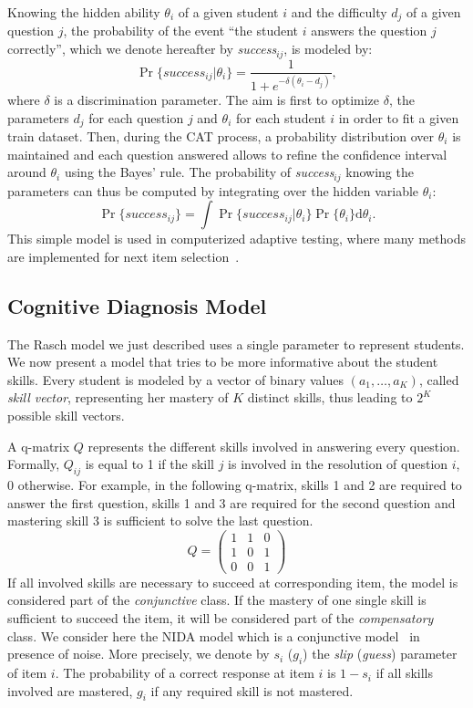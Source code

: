 \documentclass{edm_template}
\begin{document}
Knowing the hidden ability $\theta_i$ of a given student $i$ and the difficulty $d_j$ of a given question $j$, the probability of the event ``the student $i$ answers the question $j$ correctly'', which we denote hereafter by \emph{success}$_{ij}$, is modeled by:
\[ \Pr\{success_{ij}|\theta_i\} = \frac1{1+e^{-\delta(\theta_i - d_j)}}, \]
where $\delta$ is a discrimination parameter. The aim is first to optimize $\delta$, the parameters $d_j$ for each question $j$ and $\theta_i$ for each student $i$ in order to fit a given train dataset. Then, during the CAT process, a probability distribution over $\theta_i$ is maintained and each question answered allows to refine the confidence interval around $\theta_i$ using the Bayes' rule. The probability of \emph{success}$_{ij}$ knowing the parameters can thus be computed by integrating over the hidden variable $\theta_i$:
\[ \Pr\{success_{ij}\} = \int \Pr\{success_{ij}|\theta_i\} \Pr\{\theta_i\} \mathrm d\theta_i. \]
This simple model is used in computerized adaptive testing, where many methods are implemented for next item selection~\cite{MagisRaiche2012}.

\subsection{Cognitive Diagnosis Model}

The Rasch model we just described uses a single parameter to represent students. We now present a model that tries to be more informative about the student skills. Every student is modeled by a vector of binary values $(a_1, \ldots, a_K)$, called \emph{skill vector}, representing her mastery of $K$ distinct skills, thus leading to $2^K$ possible skill vectors. 

A q-matrix $Q$ \cite{Tatsuoka1983} represents the different skills involved in answering every question. Formally, $Q_{ij}$ is equal to 1 if the skill $j$ is involved in the resolution of question $i$, 0 otherwise. For example, in the following q-matrix, skills 1 and 2 are required to answer the first question, skills 1 and 3 are required for the second question and mastering skill 3 is sufficient to solve the last question.
\[ Q = \left(\begin{array}{lll}
1 & 1 & 0\\
1 & 0 & 1\\
0 & 0 & 1
\end{array}\right) \]
If all involved skills are necessary to succeed at corresponding item, the model is considered part of the \emph{conjunctive} class. 
If the mastery of one single skill is sufficient to succeed the item, it will be considered part of the \emph{compensatory} class. We consider here the NIDA model which is a conjunctive model~\cite{Desmarais2012} in presence of noise. More precisely, we denote by $s_i$ ($g_i$) the \emph{slip} (\emph{guess}) parameter of item $i$. The probability of a correct response at item $i$ is $1 - s_i$ if all skills involved are mastered, $g_i$ if any required skill is not mastered.
\end{document}

